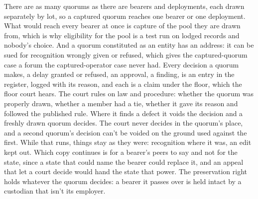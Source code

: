 There are as many quorums as there are bearers and deployments, each drawn separately by lot, so a captured quorum reaches one bearer or one deployment. What would reach every bearer at once is capture of the pool they are drawn from, which is why eligibility for the pool is a test run on lodged records and nobody's choice. And a quorum constituted as an entity has an address: it can be sued for recognition wrongly given or refused, which gives the captured-quorum case a forum the captured-operator case never had.
Every decision a quorum makes, a delay granted or refused, an approval, a finding, is an entry in the register, logged with its reason, and each is a claim under the floor, which the floor court hears. The court rules on law and procedure: whether the quorum was properly drawn, whether a member had a tie, whether it gave its reason and followed the published rule. Where it finds a defect it voids the decision and a freshly drawn quorum decides. The court never decides in the quorum's place, and a second quorum's decision can't be voided on the ground used against the first. While that runs, things stay as they were: recognition where it was, an edit kept out. Which copy continues is for a bearer's peers to say and not for the state, since a state that could name the bearer could replace it, and an appeal that let a court decide would hand the state that power. The preservation right holds whatever the quorum decides: a bearer it passes over is held intact by a custodian that isn't its employer.

